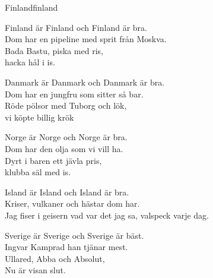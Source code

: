 \begin{song}{Finland}{finland}
\begin{vers}
Finland är Finland och Finland är bra.\\
Dom har en pipeline med sprit från Moskva.\\
Bada Bastu, piska med ris,\\
hacka hål i is.\\
\end{vers}
\begin{vers}
Danmark är Danmark och Danmark är bra.\\
Dom har en jungfru som sitter så bar.\\
Röde pölsor med Tuborg och lök,\\
vi köpte billig krök\\
\end{vers}
\begin{vers}
Norge är Norge och Norge är bra.\\
Dom har den olja som vi vill ha.\\
Dyrt i baren ett jävla pris,\\
klubba säl med is.\\
\end{vers}
\begin{vers}
Island är Island och Island är bra.\\
Kriser, vulkaner och hästar dom har.\\
Jag fiser i geisern vad var det jag sa, valspeck varje dag.\\
\end{vers}
\begin{vers} 
Sverige är Sverige och Sverige är bäst.\\
Ingvar Kamprad han tjänar mest.\\
Ullared, Abba och Absolut,\\
Nu är visan slut.\\
\end{vers}
\end{song}

